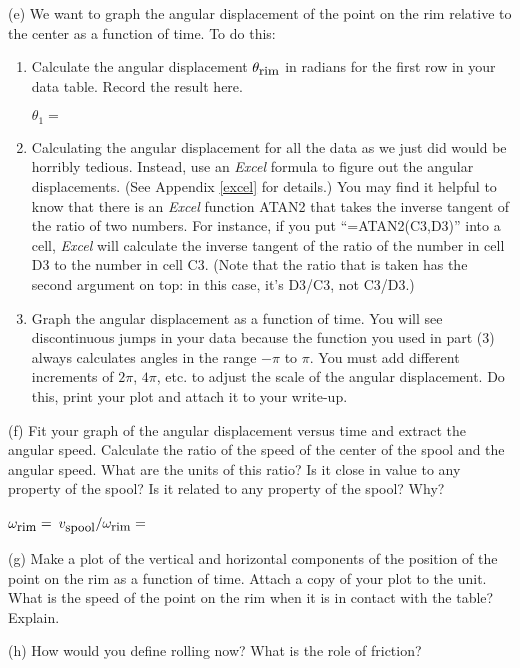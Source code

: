 (e) We want to graph the angular displacement of the point on the rim relative
to the center as a function of time. To do this:

\begin{enumerate}
\item Calculate the angular displacement \( \theta _{\mbox{\small rim}} \) in radians for the first
row in your data table. Record the result here.

$\theta _{1}=$

\item Calculating the angular displacement for all the data as we just did
would be horribly tedious. Instead, use an {\it Excel} formula to
figure out the angular displacements.  (See Appendix \ref{excel} for details.)
You may find it helpful to know that there is an {\it Excel} function
ATAN2 that takes the inverse tangent of the ratio of two numbers.
For instance, if you put ``=ATAN2(C3,D3)'' into a cell, {\it Excel}
will calculate the inverse tangent of the ratio of the number
in cell D3 to the number in cell C3.  (Note that the ratio
that is taken has the second argument on top: in this case, it's 
D3/C3, not C3/D3.)


\item Graph the angular displacement as a function of time.
You will see discontinuous jumps in your data because the function you used
in part (3) always calculates angles in the range \( -\pi  \) to \( \pi  \).
You must add different increments of \( 2\pi  \), \( 4\pi  \), etc. to adjust
the scale of the angular displacement. Do this, print your plot and attach it
to your write-up. 
\end{enumerate}

(f) Fit your graph of the angular displacement versus time and extract the angular
speed. Calculate the ratio of the speed of the center of the spool and the angular
speed. What are the units of this ratio? Is it close in value to any property
of the spool? Is it related to any property of the spool? Why?
\vspace{5mm}

\( \omega _{\mbox{\small rim}}= \)\hfill{} \( v_{\mbox{\small spool}}/
\omega _{\mbox{\small rim}}= \)\hfill{}
\vspace{10mm}

(g) Make a plot of the vertical and horizontal components of the position of
the point on the rim as a function of time. Attach a copy of your plot to the
unit. What is the speed of the point on the rim when it is in contact with the
table? Explain.
\vspace{20mm}

(h) How would you define rolling now? What is the role of friction?

